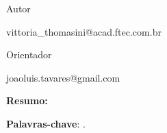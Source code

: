 \begin{Spacing}{1.0}

\begin{center}
    \ABNTEXchapterfont\bfseries\large\imprimirtitulo
\end{center}
\hfill

\hspace*{0pt}\hfill \bfseries\normalsize \imprimirautor

\hspace*{0pt}\hfill \normalfont Autor

\hspace*{0pt}\hfill \normalfont vittoria\_thomasini@acad.ftec.com.br

\hfill

\hspace*{0pt}\hfill
{\bfseries\normalsize \imprimirorientador\par}

\hspace*{0pt}\hfill \normalfont\normalsize Orientador

\hspace*{0pt}\hfill \normalfont joaoluis.tavares@gmail.com

\hfill

\hfill

\begin{resumo}
    
\textbf{Resumo:} 

\hfill

\textbf{Palavras-chave}: .
\end{resumo}
\end{Spacing}\PRIVATEclearpageifneeded